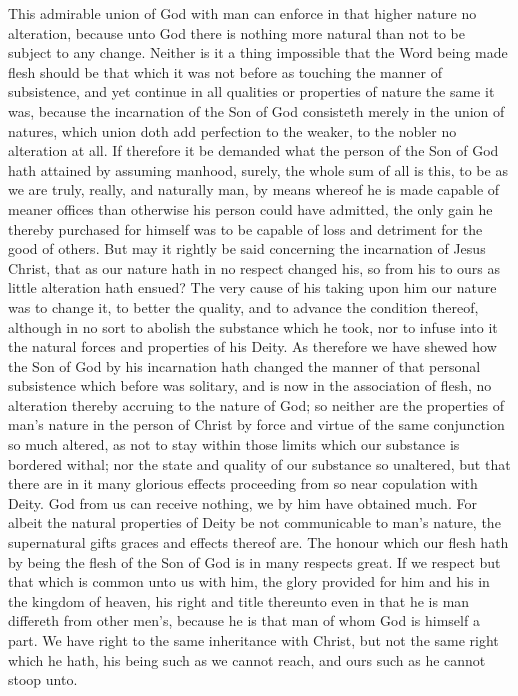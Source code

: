 This admirable union of God with man can enforce in that higher nature no alteration, because unto God there is nothing more natural than not to be subject to any change. Neither is it a thing impossible that the Word being made flesh should be that which it was not before as touching the manner of subsistence, and yet continue in all qualities or properties of nature the same it was, because the incarnation of the Son of God consisteth merely in the union of natures, which union doth add perfection to the weaker, to the nobler no alteration at all. If therefore it be demanded what the person of the Son of God hath attained by assuming manhood, surely, the whole sum of all is this, to be as we are truly, really, and naturally man, by means whereof he is made capable of meaner offices than otherwise his person could have admitted, the only gain he thereby purchased for himself was to be capable of loss and detriment for the good of others.
But may it rightly be said concerning the incarnation of Jesus Christ, that as our nature hath in no respect changed his, so from his to ours as little alteration hath ensued? The very cause of his taking upon him our nature was to change it, to better the quality, and to advance the condition thereof, although in no sort to abolish the substance which he took, nor to infuse into it the natural forces and properties of his Deity. As therefore we have shewed how the Son of God by his incarnation hath changed the manner of that personal subsistence which before was solitary, and is now in the association of flesh, no alteration thereby accruing to the nature of God; so neither are the properties of man’s nature in the person of Christ by force and virtue of the same conjunction so much altered, as not to stay within those limits which our substance is bordered withal; nor the state and quality of our substance so unaltered, but that there are in it many glorious effects  proceeding from so near copulation with Deity. God from us can receive nothing, we by him have obtained much. For albeit the natural properties of Deity be not communicable to man’s nature, the supernatural gifts graces and effects thereof are.
The honour which our flesh hath by being the flesh of the Son of God is in many respects great. If we respect but that which is common unto us with him, the glory provided for him and his in the kingdom of heaven, his right and title thereunto even in that he is man differeth from other men’s, because he is that man of whom God is himself a part. We have right to the same inheritance with Christ, but not the same right which he hath, his being such as we cannot reach, and ours such as he cannot stoop unto.
